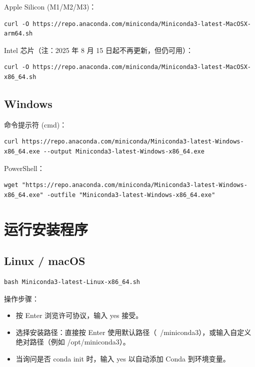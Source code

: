 \documentclass[12pt,UTF8]{ctexbook}
\begin{document}
Apple Silicon (M1/M2/M3)：

\begin{lstlisting}
curl -O https://repo.anaconda.com/miniconda/Miniconda3-latest-MacOSX-arm64.sh
\end{lstlisting}

Intel 芯片（注：2025 年 8 月 15 日起不再更新，但仍可用）：

\begin{lstlisting}
curl -O https://repo.anaconda.com/miniconda/Miniconda3-latest-MacOSX-x86_64.sh
\end{lstlisting}

\subsection{Windows}

命令提示符 (cmd)：

\begin{lstlisting}
curl https://repo.anaconda.com/miniconda/Miniconda3-latest-Windows-x86_64.exe --output Miniconda3-latest-Windows-x86_64.exe
\end{lstlisting}

PowerShell：

\begin{lstlisting}
wget "https://repo.anaconda.com/miniconda/Miniconda3-latest-Windows-x86_64.exe" -outfile "Miniconda3-latest-Windows-x86_64.exe"
\end{lstlisting}

\section{运行安装程序}
\label{sec:run_installer}

\subsection{Linux / macOS}

\begin{lstlisting}
bash Miniconda3-latest-Linux-x86_64.sh
\end{lstlisting}

操作步骤：
\begin{itemize}[leftmargin=2cm]
    \item 按 Enter 浏览许可协议，输入 yes 接受。
    \item 选择安装路径：直接按 Enter 使用默认路径（~/miniconda3），或输入自定义绝对路径（例如 /opt/miniconda3）。
    \item 当询问是否 conda init 时，输入 yes 以自动添加 Conda 到环境变量。
\end{itemize}
\end{document}
